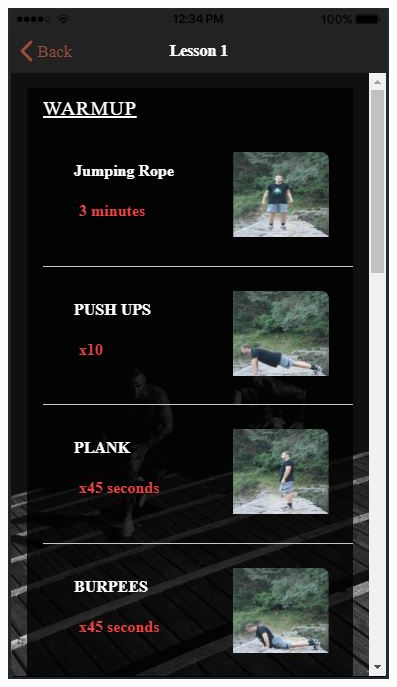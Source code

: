 \documentclass[a4paper,12pt]{article}
\begin{document}
\begin{figure}[!htb]
				\endminipage\hfill
				  \includegraphics[width=\linewidth]{lesson1}
				\endminipage\hfill
			
			\end{figure}
			\vspace*{1cm}
\end{document}
